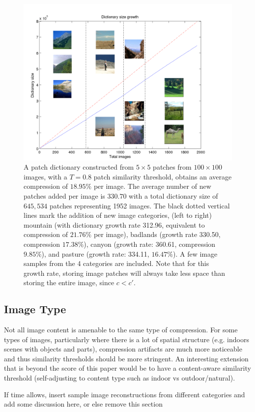  \begin{figure}
\hspace{-5mm}
\includegraphics[width=1.3\linewidth]{Figures/multiscenes.pdf}
\caption{A patch dictionary constructed from $5\times 5$ patches from $100\times 100$ images, with a $T=0.8$ patch similarity threshold, obtains an average compression of $18.95\%$ per image. The average number of new patches added per image is $330.70$ with a total dictionary size of $645,534$ patches representing 1952 images. The black dotted vertical lines mark the addition of new image categories, (left to right) mountain (with dictionary growth rate 312.96, equivalent to compression of $21.76\%$ per image), badlands (growth rate 330.50, compression $17.38\%$), canyon (growth rate: 360.61, compression $9.85\%$), and pasture (growth rate: 334.11, $16.47\%$). A few image samples from the 4 categories are included.  Note that for this growth rate, storing image patches will always take less space than storing the entire image, since $c < c'$.}
\label{fig:bigsize}
\end{figure}

\subsection{Image Type}

Not all image content is amenable to the same type of compression. For some types of images, particularly where there is a lot of spatial structure (e.g. indoors scenes with objects and parts), compression artifacts are much more noticeable and thus similarity thresholds should be more stringent. An interesting extension that is beyond the score of this paper would be to have a content-aware similarity threshold (self-adjusting to content type such as indoor vs outdoor/natural).

\begin{edit}
If time allows, insert sample image reconstructions from different categories and add some discussion here, or else remove this section
\end{edit}
